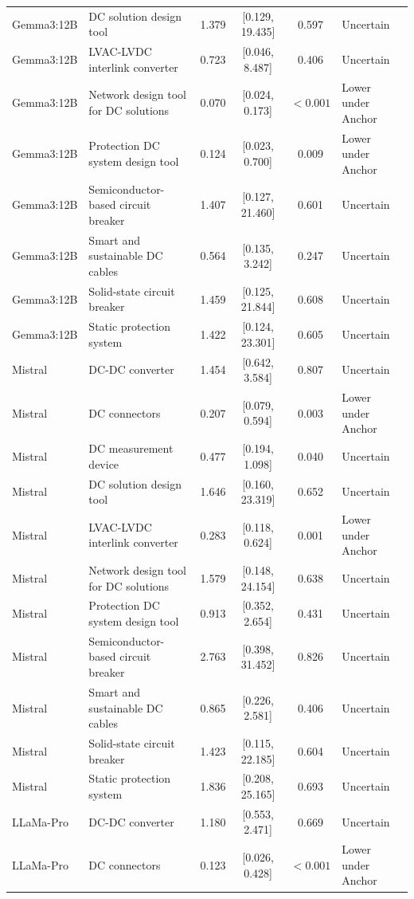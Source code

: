 \begin{longtable}[tbp]{p{2.2cm}p{5.0cm}cccp{3.2cm}}
Gemma3:12B & DC solution design tool & 1.379 & [0.129, 19.435] & 0.597 & Uncertain \\
Gemma3:12B & LVAC-LVDC interlink converter & 0.723 & [0.046, 8.487] & 0.406 & Uncertain \\
Gemma3:12B & Network design tool for DC solutions & 0.070 & [0.024, 0.173] & $<0.001$ & Lower under Anchor \\
Gemma3:12B & Protection DC system design tool & 0.124 & [0.023, 0.700] & 0.009 & Lower under Anchor \\
Gemma3:12B & Semiconductor-based circuit breaker & 1.407 & [0.127, 21.460] & 0.601 & Uncertain \\
Gemma3:12B & Smart and sustainable DC cables & 0.564 & [0.135, 3.242] & 0.247 & Uncertain \\
Gemma3:12B & Solid-state circuit breaker & 1.459 & [0.125, 21.844] & 0.608 & Uncertain \\
Gemma3:12B & Static protection system & 1.422 & [0.124, 23.301] & 0.605 & Uncertain \\
Mistral & DC-DC converter & 1.454 & [0.642, 3.584] & 0.807 & Uncertain \\
Mistral & DC connectors & 0.207 & [0.079, 0.594] & 0.003 & Lower under Anchor \\
Mistral & DC measurement device & 0.477 & [0.194, 1.098] & 0.040 & Uncertain \\
Mistral & DC solution design tool & 1.646 & [0.160, 23.319] & 0.652 & Uncertain \\
Mistral & LVAC-LVDC interlink converter & 0.283 & [0.118, 0.624] & 0.001 & Lower under Anchor \\
Mistral & Network design tool for DC solutions & 1.579 & [0.148, 24.154] & 0.638 & Uncertain \\
Mistral & Protection DC system design tool & 0.913 & [0.352, 2.654] & 0.431 & Uncertain \\
Mistral & Semiconductor-based circuit breaker & 2.763 & [0.398, 31.452] & 0.826 & Uncertain \\
Mistral & Smart and sustainable DC cables & 0.865 & [0.226, 2.581] & 0.406 & Uncertain \\
Mistral & Solid-state circuit breaker & 1.423 & [0.115, 22.185] & 0.604 & Uncertain \\
Mistral & Static protection system & 1.836 & [0.208, 25.165] & 0.693 & Uncertain \\
LLaMa-Pro & DC-DC converter & 1.180 & [0.553, 2.471] & 0.669 & Uncertain \\
LLaMa-Pro & DC connectors & 0.123 & [0.026, 0.428] & $<0.001$ & Lower under Anchor \\

\end{longtable}
